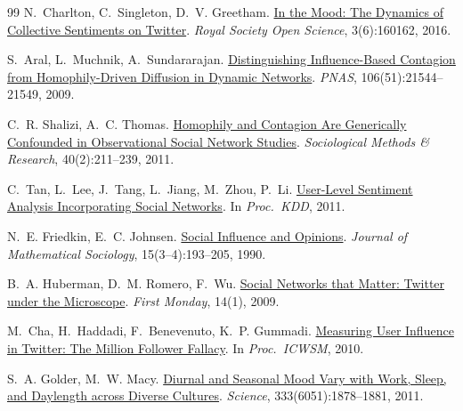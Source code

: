 \documentclass[twocolumn,10pt]{article}
\makeatletter
\newcommand{\paperurlof}[1]{\csname paperurl@#1\endcsname}
\newcommand{\reftitle}[2]{\href{\paperurlof{#1}}{#2}}
\makeatother
\begin{document}
\begin{thebibliography}{99}
N.~Charlton, C.~Singleton, D.~V. Greetham.
\newblock \reftitle{charlton2016}{In the Mood: The Dynamics of Collective
Sentiments on Twitter}.
\newblock \emph{Royal Society Open Science}, 3(6):160162, 2016.

S.~Aral, L.~Muchnik, A.~Sundararajan.
\newblock \reftitle{aral2009}{Distinguishing Influence-Based Contagion from
Homophily-Driven Diffusion in Dynamic Networks}.
\newblock \emph{PNAS}, 106(51):21544--21549, 2009.

C.~R. Shalizi, A.~C. Thomas.
\newblock \reftitle{shalizi2011}{Homophily and Contagion Are Generically
Confounded in Observational Social Network Studies}.
\newblock \emph{Sociological Methods \& Research}, 40(2):211--239, 2011.

C.~Tan, L.~Lee, J.~Tang, L.~Jiang, M.~Zhou, P.~Li.
\newblock \reftitle{tan2011}{User-Level Sentiment Analysis Incorporating
Social Networks}.
\newblock In \emph{Proc.\ KDD}, 2011.

N.~E. Friedkin, E.~C. Johnsen.
\newblock \reftitle{friedkin1990}{Social Influence and Opinions}.
\newblock \emph{Journal of Mathematical Sociology}, 15(3--4):193--205, 1990.

B.~A. Huberman, D.~M. Romero, F.~Wu.
\newblock \reftitle{huberman2009}{Social Networks that Matter: Twitter under
the Microscope}.
\newblock \emph{First Monday}, 14(1), 2009.

M.~Cha, H.~Haddadi, F.~Benevenuto, K.~P. Gummadi.
\newblock \reftitle{cha2010}{Measuring User Influence in Twitter: The
Million Follower Fallacy}.
\newblock In \emph{Proc.\ ICWSM}, 2010.

S.~A. Golder, M.~W. Macy.
\newblock \reftitle{golder2011}{Diurnal and Seasonal Mood Vary with Work,
Sleep, and Daylength across Diverse Cultures}.
\newblock \emph{Science}, 333(6051):1878--1881, 2011.

\end{thebibliography}
\end{document}
